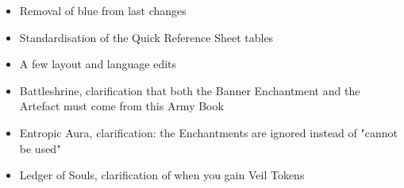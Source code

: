 

\subtitle{beta 2.1.5}

\begin{itemize}
\item Removal of blue from last changes
\item Standardisation of the Quick Reference Sheet tables
\item A few layout and language edits
\item Battleshrine, clarification that both the Banner Enchantment and the Artefact must come from this Army Book
\item Entropic Aura, clarification: the Enchantments are ignored instead of "cannot be used"
\item Ledger of Souls, clarification of when you gain Veil Tokens
\end{itemize}
